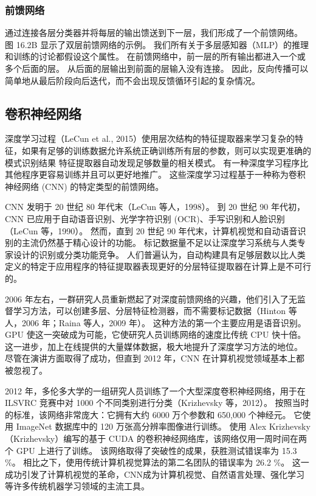\subsubsection{前馈网络}
通过连接各层分类器并将每层的输出馈送到下一层，我们形成了一个前馈网络。 图 16.2B 显示了双层前馈网络的示例。 我们所有关于多层感知器（MLP）的推理和训练的讨论都假设这个属性。 在前馈网络中，前一层的所有输出都进入一个或多个后面的层。 从后面的层输出到前面的层输入没有连接。 因此，反向传播可以简单地从最后阶段向后迭代，而不会出现反馈循环引起的复杂情况。

\subsection{卷积神经网络}
深度学习过程（LeCun et al., 2015）使用层次结构的特征提取器来学习复杂的特征，如果有足够的训练数据允许系统正确训练所有层的参数，则可以实现更准确的模式识别结果 特征提取器自动发现足够数量的相关模式。 有一种深度学习程序比其他程序更容易训练并且可以更好地推广。 这些深度学习过程基于一种称为卷积神经网络 (CNN) 的特定类型的前馈网络。

CNN 发明于 20 世纪 80 年代末（LeCun 等人，1998）。 到 20 世纪 90 年代初，CNN 已应用于自动语音识别、光学字符识别 (OCR)、手写识别和人脸识别（LeCun 等，1990）。 然而，直到 20 世纪 90 年代末，计算机视觉和自动语音识别的主流仍然基于精心设计的功能。 标记数据量不足以让深度学习系统与人类专家设计的识别或分类功能竞争。 人们普遍认为，自动构建具有足够层数以比人类定义的特定于应用程序的特征提取器表现更好的分层特征提取器在计算上是不可行的。

2006 年左右，一群研究人员重新燃起了对深度前馈网络的兴趣，他们引入了无监督学习方法，可以创建多层、分层特征检测器，而不需要标记数据（Hinton 等人，2006 年；Raina 等人，2009 年）。 这种方法的第一个主要应用是语音识别。 GPU 使这一突破成为可能，它使研究人员训练网络的速度比传统 CPU 快十倍。 这一进步，加上在线提供的大量媒体数据，极大地提升了深度学习方法的地位。 尽管在演讲方面取得了成功，但直到 2012 年，CNN 在计算机视觉领域基本上都被忽视了。

2012 年，多伦多大学的一组研究人员训练了一个大型深度卷积神经网络，用于在 ILSVRC 竞赛中对 1000 个不同类别进行分类（Krizhevsky 等，2012）。 按照当时的标准，该网络非常庞大：它拥有大约 6000 万个参数和 650,000 个神经元。 它使用 ImageNet 数据库中的 120 万张高分辨率图像进行训练。 使用 Alex Krizhevsky（Krizhevsky）编写的基于 CUDA 的卷积神经网络库，该网络仅用一周时间在两个 GPU 上进行了训练。 该网络取得了突破性的成果，获胜测试错误率为 15.3 \%。 相比之下，使用传统计算机视觉算法的第二名团队的错误率为 26.2 \%。 这一成功引发了计算机视觉的革命，CNN成为计算机视觉、自然语言处理、强化学习等许多传统机器学习领域的主流工具。

